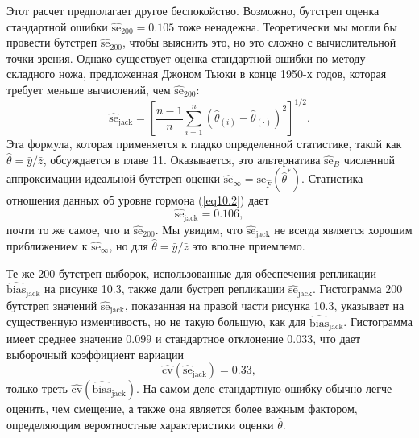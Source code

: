 Этот расчет предполагает другое беспокойство. Возможно, бутстреп оценка стандартной ошибки $\widehat{\text{se}}_{200} = 0.105$ тоже ненадежна. Теоретически мы могли бы провести бутстреп $\widehat{\text{se}}_{200}$, чтобы выяснить это, но это сложно с вычислительной точки зрения. Однако существует оценка стандартной ошибки по методу складного ножа, предложенная Джоном Тьюки в конце 1950-х годов, которая требует меньше вычислений, чем $\widehat{\text{se}}_{200}$:
\begin{equation}\label{eq10.34}
    \widehat{\text{se}}_{\text{jack}} = \left[\frac{n-1}{n}\sum\limits_{i=1}^{n}\left(\hat{\theta}_{(i)} - \hat{\theta}_{(\cdot)}\right)^{2}\right]^{1/2}.
\end{equation}
Эта формула, которая применяется к гладко определенной статистике, такой как $\hat{\theta} = \bar{y}/\bar{z}$, обсуждается в главе 11. Оказывается, это альтернатива $\widehat{\text{se}}_{B}$ численной аппроксимации идеальной бутстреп оценки $\widehat{\text{se}}_{\infty} = \text{se}_{\hat{F}}(\hat{\theta}^{*})$. Статистика отношения данных об уровне гормона (\ref{eq10.2}) дает
\begin{equation}\label{eq10.35}
   \widehat{\text{se}}_{\text{jack}} = 0.106,
\end{equation}
почти то же самое, что и $\widehat{\text{se}}_{200}$. Мы увидим, что $\widehat{\text{se}}_{\text{jack}}$ не всегда является хорошим приближением к $\widehat{\text{se}}_{\infty}$, но для $\hat{\theta} = \bar{y}/\bar{z}$ это вполне приемлемо.

Те же $200$ бутстреп выборок, использованные для обеспечения репликации $\widehat{\text{bias}}_{\text{jack}}$ на рисунке 10.3, также дали бустреп репликации $\widehat{\text{se}}_{\text{jack}}$. Гистограмма $200$ бутстреп значений  $\widehat{\text{se}}_{\text{jack}}$, показанная на правой части рисунка 10.3, указывает на существенную изменчивость, но не такую большую, как для $\widehat{\text{bias}}_{\text{jack}}$. Гистограмма имеет среднее значение $0.099$ и стандартное отклонение $0.033$, что дает выборочный коэффициент вариации
\begin{equation}\label{eq10.36}
   \widehat{\text{cv}}(\widehat{\text{se}}_{\text{jack}}) = 0.33,
\end{equation}
только треть $\widehat{\text{cv}}(\widehat{\text{bias}}_{\text{jack}})$. На самом деле стандартную ошибку обычно легче оценить, чем смещение, а также она является более важным фактором, определяющим вероятностные характеристики оценки $\hat{\theta}$.

